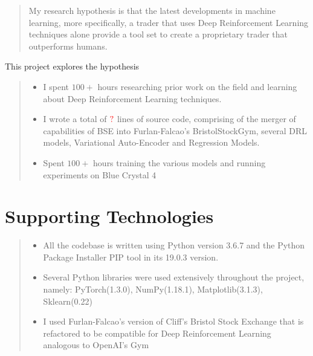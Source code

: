 \documentclass[ %
                    author={Ashwinder Khurana},
                supervisor={Prof Dave Cliff},
                    degree={MEng},
                     title={The Deeply Reinforced Trader},
                  subtitle={},
                      type={enterprise},
                      year={2020} ]{dissertation}
\begin{document}
\begin{quote}
My research hypothesis is that the latest developments in machine learning, more specifically, a trader that uses Deep Reinforcement Learning techniques alone provide a tool set to create a proprietary trader that outperforms humans.  
\end{quote}

\noindent
This project explores the hypothesis 


\begin{quote}
\noindent
\begin{itemize}
\item I spent $100+$ hours researching prior work on the field and learning about Deep Reinforcement Learning techniques. 
\item I wrote a total of $\color{red}{?}$ lines of source code, comprising of the merger of capabilities of BSE into Furlan-Falcao's BristolStockGym, several DRL models, Variational Auto-Encoder and Regression Models.
\item Spent $100+$ hours training the various models and running experiments on Blue Crystal 4 \cite{BC4} 
\end{itemize}
\end{quote}


\chapter*{Supporting Technologies}

\begin{quote}
\noindent
\begin{itemize}
\item All the codebase is written using Python version 3.6.7 and the Python Package Installer PIP tool in its 19.0.3 version.
\item Several Python libraries were used extensively throughout the project, namely: PyTorch(1.3.0), NumPy(1.18.1), Matplotlib(3.1.3), Sklearn(0.22)
\item I used Furlan-Falcao's version of Cliff's Bristol Stock Exchange that is refactored to be compatible for Deep Reinforcement Learning analogous to OpenAI's Gym 

\end{itemize}
\end{quote}

\end{document}
